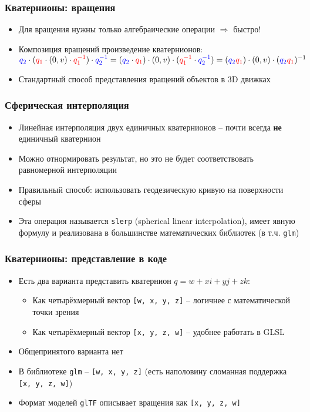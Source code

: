 \documentclass{beamer}
\begin{document}
\begin{frame}[fragile]
\frametitle{Кватернионы: вращения}
\begin{itemize}
\item Для вращения нужны только алгебраические операции \begin{math}\Rightarrow\end{math} быстро!
\pause
\item Композиция вращений \textendash{} произведение кватернионов: \begin{math}{\color{blue}q_2} \cdot ({\color{red}q_1} \cdot (0, v) \cdot {\color{red}q_1^{-1}}) \cdot {\color{blue}q_2^{-1}} = ({\color{blue}q_2} \cdot {\color{red}q_1}) \cdot (0, v) \cdot ({\color{red}q_1^{-1}} \cdot {\color{blue}q_2^{-1}}) = ({\color{blue}q_2}{\color{red}q_1}) \cdot (0, v) \cdot ({\color{blue}q_2}{\color{red}q_1})^{-1}\end{math}
\pause
\item Стандартный способ представления вращений объектов в 3D движках
\end{itemize}
\end{frame}

\begin{frame}[fragile]
\frametitle{Сферическая интерполяция}
\begin{itemize}
\item Линейная интерполяция двух единичных кватернионов -- почти всегда \textbf{не} единичный кватернион
\pause
\item Можно отнормировать результат, но это не будет соответствовать равномерной интерполяции
\pause
\item Правильный способ: использовать геодезическую кривую на поверхности сферы
\pause
\item Эта операция называется \verb|slerp| (spherical linear interpolation), имеет явную формулу и реализована в большинстве математических библиотек (в т.ч. \verb|glm|)
\end{itemize}
\end{frame}

\begin{frame}[fragile]
\frametitle{Кватернионы: представление в коде}
\begin{itemize}
\item Есть два варианта представить кватернион \begin{math}q = w + xi + yj + zk\end{math}:
\pause
\begin{itemize}
\item Как четырёхмерный вектор \verb|[w, x, y, z]| -- логичнее с математической точки зрения
\item Как четырёхмерный вектор \verb|[x, y, z, w]| -- удобнее работать в GLSL
\end{itemize}
\pause
\item Общепринятого варианта нет
\item В библиотеке \verb|glm| -- \verb|[w, x, y, z]| (есть наполовину сломанная поддержка \verb|[x, y, z, w]|)
\item Формат моделей \verb|glTF| описывает вращения как \verb|[x, y, z, w]|
\end{itemize}
\end{frame}
\end{document}
